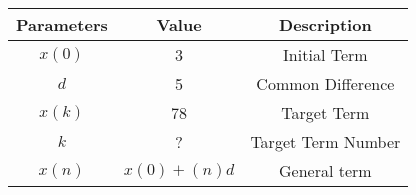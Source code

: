 \begin{tabular}{|c|c|c|}
  \hline
  Parameters & Value & Description \\
  \hline
  \(x(0)\) & 3 & Initial Term \\
  \hline
  \(d\) & 5 & Common Difference \\
  \hline
  \(x(k)\) & 78 & Target Term \\
  \hline
  \(k\) & ? & Target Term Number\\
  \hline
  \(x(n)\) & \(x(0) + (n)d\) & General term\\
  \hline
\end{tabular}
